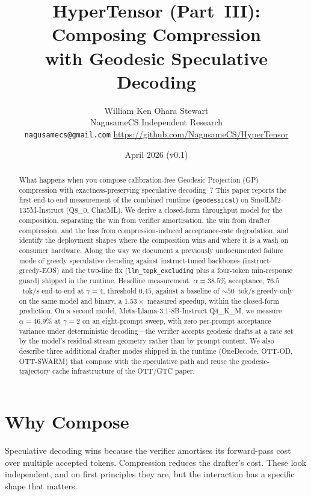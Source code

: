 \documentclass[11pt]{article}
\title{HyperTensor (Part~III): Composing Compression\\with Geodesic Speculative Decoding}
\author{William Ken Ohara Stewart\\
\small NagusameCS Independent Research\\
\small \texttt{nagusamecs@gmail.com} \quad \url{https://github.com/NagusameCS/HyperTensor}}
\date{April 2026 (v0.1)}
\begin{document}
\maketitle
\hypertensorbanner

\begin{abstract}
\noindent
What happens when you compose calibration-free Geodesic Projection (GP) compression with
exactness-preserving speculative decoding~\cite{leviathan2023speculative,
chen2023speculative}?  This paper reports the first end-to-end measurement of the
combined runtime (\texttt{geodessical}) on
SmolLM2-135M-Instruct (Q8\_0, ChatML).  We derive a closed-form
throughput model for the composition, separating the win from
verifier amortisation, the win from drafter compression, and the loss
from compression-induced acceptance-rate degradation, and identify the
deployment shapes where the composition wins and where it is a wash on
consumer hardware.  Along the way we document a previously
undocumented failure mode of greedy speculative decoding against
instruct-tuned backbones (instruct-greedy-EOS) and the
two-line fix (\texttt{llm\_topk\_excluding} plus a four-token min-response
guard) shipped in the runtime.  Headline measurement: $\alpha{=}38.5\%$
acceptance, $76.5$~tok/s end-to-end at $\gamma{=}4$,
threshold $0.45$, against a baseline of $\sim 50$~tok/s greedy-only on the
same model and binary, a $1.53\times$ measured speedup, within the
closed-form prediction.  On a second model,
Meta-Llama-3.1-8B-Instruct Q4\_K\_M, we measure
$\alpha{=}46.9\%$ at $\gamma{=}2$ on an eight-prompt sweep, with
zero per-prompt acceptance variance under deterministic decoding---the
verifier accepts geodesic drafts at a rate set by the
model's residual-stream geometry rather than by prompt content.  We also describe three additional drafter modes
shipped in the runtime (OneDecode, OTT-OD, OTT-SWARM)
that compose with the speculative path and reuse the geodesic-trajectory
cache infrastructure of the OTT/GTC paper.
\end{abstract}

\section{Why Compose}
\label{sec:why}
Speculative decoding wins because the verifier amortises its forward-pass
cost over multiple accepted tokens.  Compression reduces the drafter's
cost.  These look independent, and on first principles they are, but the
interaction has a specific shape that matters.
\end{document}
